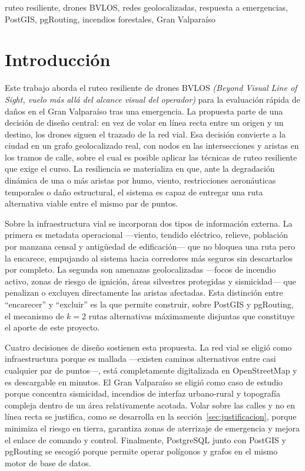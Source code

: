\documentclass[conference]{IEEEtran}
\begin{document}
\begin{IEEEkeywords}
ruteo resiliente, drones BVLOS, redes geolocalizadas, respuesta a emergencias, PostGIS, pgRouting, incendios forestales, Gran Valparaíso
\end{IEEEkeywords}

\section{Introducción}

Este trabajo aborda el ruteo resiliente de drones BVLOS \textit{(Beyond Visual Line of Sight, vuelo más allá del alcance visual del operador)} para la evaluación rápida de daños en el Gran Valparaíso tras una emergencia. La propuesta parte de una decisión de diseño central: en vez de volar en línea recta entre un origen y un destino, los drones siguen el trazado de la red vial. Esa decisión convierte a la ciudad en un grafo geolocalizado real, con nodos en las intersecciones y aristas en los tramos de calle, sobre el cual es posible aplicar las técnicas de ruteo resiliente que exige el curso. La resiliencia se materializa en que, ante la degradación dinámica de una o más aristas por humo, viento, restricciones aeronáuticas temporales o daño estructural, el sistema es capaz de entregar una ruta alternativa viable entre el mismo par de puntos.

Sobre la infraestructura vial se incorporan dos tipos de información externa. La primera es metadata operacional ---viento, tendido eléctrico, relieve, población por manzana censal y antigüedad de edificación--- que no bloquea una ruta pero la encarece, empujando al sistema hacia corredores más seguros sin descartarlos por completo. La segunda son amenazas geolocalizadas ---focos de incendio activo, zonas de riesgo de ignición, áreas silvestres protegidas y sismicidad--- que penalizan o excluyen directamente las aristas afectadas. Esta distinción entre ``encarecer'' y ``excluir'' es la que permite construir, sobre PostGIS y pgRouting, el mecanismo de $k=2$ rutas alternativas máximamente disjuntas que constituye el aporte de este proyecto.

Cuatro decisiones de diseño sostienen esta propuesta. La red vial se eligió como infraestructura porque es mallada ---existen caminos alternativos entre casi cualquier par de puntos---, está completamente digitalizada en OpenStreetMap y es descargable en minutos. El Gran Valparaíso se eligió como caso de estudio porque concentra sismicidad, incendios de interfaz urbano-rural y topografía compleja dentro de un área relativamente acotada. Volar sobre las calles y no en línea recta se justifica, como se desarrolla en la sección~\ref{sec:justificacion}, porque minimiza el riesgo en tierra, garantiza zonas de aterrizaje de emergencia y mejora el enlace de comando y control. Finalmente, PostgreSQL junto con PostGIS y pgRouting se escogió porque permite operar polígonos y grafos en el mismo motor de base de datos.
\end{document}
